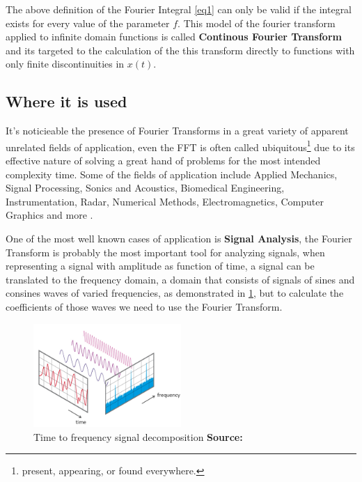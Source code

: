 \documentclass[
  oneside,
  11pt, a4paper,
  footinclude=true,
  headinclude=true,
  cleardoublepage=empty
]{scrbook}
\newcommand*{\source}[1]{%
    \textbf{Source:} \cite{#1}%
}
\begin{document}

The above definition of the Fourier Integral \autoref{eq1} can only be valid if the integral exists for every value of the parameter \(f\). This model of the fourier transform applied to infinite domain functions is called \textbf{Continous Fourier Transform} and its targeted to the calculation of the this transform directly to functions with only finite discontinuities in \( x(t) \).

\subsection{Where it is used} \label{subsec:where-it-is-used}

It's noticieable the presence of Fourier Transforms in a great variety of apparent unrelated fields of application, even the FFT is often called ubiquitous\footnote{present, appearing, or found everywhere.} due to its effective nature of solving a great hand of problems for the most intended complexity time. Some of the fields of application include Applied Mechanics, Signal Processing, Sonics and Acoustics, Biomedical Engineering, Instrumentation, Radar, Numerical Methods, Electromagnetics, Computer Graphics and more \cite{brigham1988fast}. %

One of the most well known cases of application is \textbf{Signal Analysis}, the Fourier Transform is probably the most important tool for analyzing signals, when representing a signal with amplitude as function of time, a signal can be translated to the frequency domain, a domain that consists of signals of sines and consines waves of varied frequencies, as demonstrated in \ref{fig:signal-decomposition}, but to calculate the coefficients of those waves we need to use the Fourier Transform.

\begin{figure}[h] 
    \centering
    \includegraphics[width=0.5\textwidth]{imgs/fft_time_freq.png}
    \caption{Time to frequency signal decomposition \source{fftntiaudio}}
    \label{fig:signal-decomposition}
\end{figure}
\end{document}
